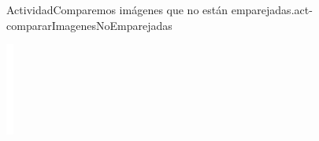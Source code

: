 \documentclass[20pt]{extarticle}
\begin{document}
\begin{activity}{Actividad}{Comparemos imágenes que no están emparejadas.}{act-compararImagenesNoEmparejadas}
\begin{image}{0}{1}{0}{}
\includegraphics[max width=\linewidth, center]{external/whitespace-tikz/2cm.pdf}

\end{image}
\end{activity}
\end{document}
